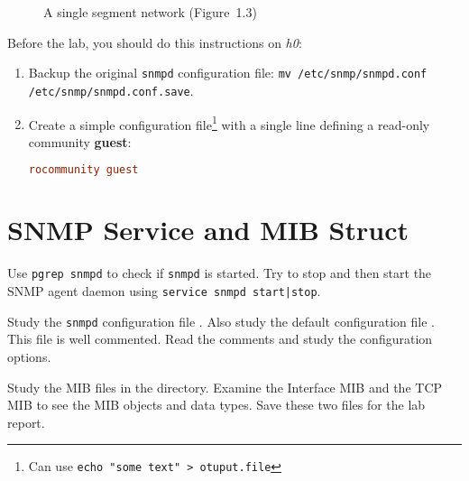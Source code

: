 \documentclass{../UTNetLab}
\begin{document}
\begin{center}
\begin{minipage}{0.48\textwidth}
\begin{flushright}
\begin{figure}[H]
                    \caption{A single segment network (Figure~1.3)}\label{fig:1.3}
                \end{figure}
            \end{flushright}
        \end{minipage}
    \end{center}

    Before the lab, you should do this instructions on \textit{h0}:
    \begin{enumerate}
        \item Backup the original \lstinline{snmpd} configuration file:
        \lstinline{mv /etc/snmp/snmpd.conf /etc/snmp/snmpd.conf.save}.
        \item Create a simple configuration file\footnote{Can use \lstinline{echo "some text" > otuput.file}}  with a single line defining a read-only community \textbf{guest}:
        \begin{lstlisting}[language={conf}, emph={guest}]
rocommunity guest
        \end{lstlisting}
    \end{enumerate}

\section{SNMP Service and MIB Struct}
    Use \lstinline{pgrep snmpd} to check if \lstinline{snmpd} is started.
    Try to stop and then start the SNMP agent daemon using \lstinline{service snmpd start|stop}.

    Study the \lstinline{snmpd} configuration file .
    Also study the default configuration file .
    This file is well commented.
    Read the comments and study the configuration options.

    Study the MIB files in the  directory.
    Examine the Interface MIB  and the TCP MIB  to see the MIB objects and data types.
    Save these two files for the lab report.
\end{document}
